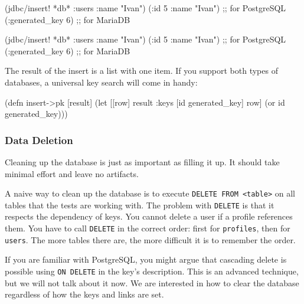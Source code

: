 \ifnarrow

\begin{english}
  \begin{clojure}
(jdbc/insert! *db*
  :users {:name "Ivan"})
({:id 5 :name "Ivan"}) ;; for PostgreSQL
({:generated_key 6})   ;; for MariaDB
  \end{clojure}
\end{english}

\else

\begin{english}
  \begin{clojure}
(jdbc/insert! *db* :users {:name "Ivan"})
({:id 5 :name "Ivan"}) ;; for PostgreSQL
({:generated_key 6})   ;; for MariaDB
  \end{clojure}
\end{english}

\fi

The result of the insert is a list with one item. If you support both types of databases, a universal key search will come in handy:

\begin{english}
  \begin{clojure}
(defn insert->pk [result]
  (let [[row] result
        {:keys [id generated_key]} row]
    (or id generated_key)))
  \end{clojure}
\end{english}

\subsubsection*{Data Deletion}


Cleaning up the database is just as important as filling it up. It should take minimal effort and leave no artifacts.

A naive way to clean up the database is to execute \verb|DELETE FROM <table>| on all tables that the tests are working with. The problem with \verb|DELETE| is that it respects the dependency of keys. You cannot delete a user if a profile references them. You have to call \verb|DELETE| in the correct order: first for \verb|profiles|, then for \verb|users|. The more tables there are, the more difficult it is to remember the order.


If you are familiar with PostgreSQL, you might argue that cascading delete is possible using \verb|ON DELETE| in the key's description. This is an advanced technique, but we will not talk about it now. We are interested in how to clear the database regardless of how the keys and links are set.

